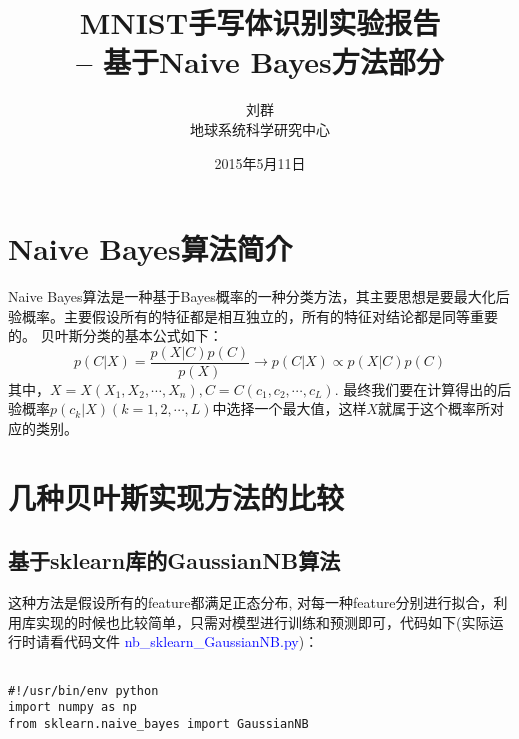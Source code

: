 \documentclass[a4paper, 1pt]{article}
\newcommand{\xiaosihao}{\fontsize{12pt}{\baselineskip}\selectfont}
\newcommand{\wuhao}{\fontsize{10.5pt}{\baselineskip}\selectfont}
\newcommand{\xiaowuhao}{\fontsize{9pt}{\baselineskip}\selectfont}
\begin{document}
\begin{spacing}{1.2}

\title{\xiaosihao MNIST手写体识别实验报告\\ -- 基于Naive Bayes方法部分}
\author{\wuhao 刘群%
\\[2ex]
\wuhao 地球系统科学研究中心\\
}
\date{\wuhao 2015年5月11日}
\maketitle

\section{\xiaosihao Naive Bayes算法简介}
Naive Bayes算法是一种基于Bayes概率的一种分类方法，其主要思想是要最大化后验概率。主要假设所有的特征都是相互独立的，所有的特征对结论都是同等重要的。
贝叶斯分类的基本公式如下：
$$p(C|X) = \frac{p(X|C)p(C)}{p(X)} \rightarrow p(C|X) \propto p(X|C)p(C)$$
其中，$X=X(X_1, X_2, \cdots, X_n), C=C(c_1, c_2, \cdots, c_L)$. %
最终我们要在计算得出的后验概率$p(c_k|X)(k=1,2,\cdots,L)$中选择一个最大值，这样$X$就属于这个概率所对应的类别。
\section{\xiaosihao 几种贝叶斯实现方法的比较}
\subsection{基于sklearn库的GaussianNB算法}
这种方法是假设所有的feature都满足正态分布, 对每一种feature分别进行拟合，利用库实现的时候也比较简单，只需对模型进行训练和预测即可，代码如下(实际运行时请看代码文件 \textcolor{blue}{ nb\_sklearn\_GaussianNB.py})：
\begin{lstlisting}

#!/usr/bin/env python
import numpy as np
from sklearn.naive_bayes import GaussianNB


\end{lstlisting}
\end{spacing}
\end{document}
